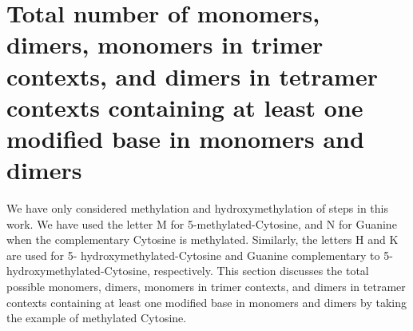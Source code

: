 \section{Total number of monomers, dimers, monomers in trimer contexts, and dimers in tetramer contexts containing at least one modified base in  monomers and dimers}
We have only considered methylation and hydroxymethylation of \cpg steps in this work. 
We have used the letter M for 5-methylated-Cytosine, and N for Guanine when the complementary Cytosine is methylated. 
Similarly, the letters H and K are used for 5- hydroxymethylated-Cytosine and Guanine complementary to 5-hydroxymethylated-Cytosine, respectively. 
This section discusses the total possible monomers, dimers, monomers in trimer contexts, and dimers in tetramer contexts containing at least one modified base in monomers and dimers by taking the example of methylated Cytosine.

